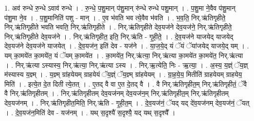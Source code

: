 \documentclass[17pt]{extarticle}
\begin{document}
1. अव॑ रुन्धे रु॒न्धे ऽवाव॑ रुन्धे । . रु॒न्धे॒ प॒शु॒मान् प॑शु॒मान् रु॑न्धे रुन्धे पशु॒मान् । . प॒शु॒मा ने॒वैव प॑शु॒मान् प॑शु॒मा ने॒व । . प॒शु॒मानिति॑ पशु - मान् । . ए॒व भ॑वति भव त्ये॒वैव भ॑वति । . भ॒व॒ति॒ निर्.ऋ॑तिगृहीते॒ निर्.ऋ॑तिगृहीते भवति भवति॒ निर्.ऋ॑तिगृहीते । . निर्.ऋ॑तिगृहीते देव॒यज॑ने देव॒यज॑ने॒ निर्.ऋ॑तिगृहीते॒ निर्.ऋ॑तिगृहीते देव॒यज॑ने । . निर्.ऋ॑तिगृहीत॒ इति॒ निर्.ऋ॑ति - गृ॒ही॒ते॒ । . दे॒व॒यज॑ने याजयेद् याजयेद् देव॒यज॑ने देव॒यज॑ने याजयेत् । . दे॒व॒यज॑न॒ इति॑ देव - यज॑ने । . या॒ज॒ये॒द् यं ॅयं ॅया॑जयेद् याजये॒द् यम् । . यम् का॒मये॑त का॒मये॑त॒ यं ॅयम् का॒मये॑त । . का॒मये॑त॒ निर्.ऋ॑त्या॒ निर्.ऋ॑त्या का॒मये॑त का॒मये॑त॒ निर्.ऋ॑त्या । . निर्.ऋ॑त्या ऽस्यास्य॒ निर्.ऋ॑त्या॒ निर्.ऋ॑त्या ऽस्य । . निर्.ऋ॒त्येति॒ निः - ऋ॒त्या॒ । . अ॒स्य॒ य॒ज्ञ्ं ॅय॒ज्ञ् म॑स्यास्य य॒ज्ञ्म् । . य॒ज्ञ्म् ग्रा॑हयेयम् ग्राहयेयं ॅय॒ज्ञ्ं ॅय॒ज्ञ्म् ग्रा॑हयेयम् । . ग्रा॒ह॒ये॒य॒ मितीति॑ ग्राहयेयम् ग्राहयेय॒ मिति॑ । . इत्ये॒त दे॒त दिती त्ये॒तत् । . ए॒तद् वै वा ए॒त दे॒तद् वै । . वै निर्.ऋ॑तिगृहीत॒म् निर्.ऋ॑तिगृहीतं॒ ॅवै वै निर्.ऋ॑तिगृहीतम् । . निर्.ऋ॑तिगृहीतम् देव॒यज॑नम् देव॒यज॑न॒म् निर्.ऋ॑तिगृहीत॒म् निर्.ऋ॑तिगृहीतम् देव॒यज॑नम् । . निर्.ऋ॑तिगृहीत॒मिति॒ निर्.ऋ॑ति - गृ॒ही॒त॒म् । . दे॒व॒यज॑नं॒ ॅयद् यद् दे॑व॒यज॑नम् देव॒यज॑नं॒ ॅयत् । . दे॒व॒यज॑न॒मिति॑ देव - यज॑नम् । . यथ् स॒दृश्यै॑ स॒दृश्यै॒ यद् यथ् स॒दृश्यै᳚ । \newline
\end{document}
